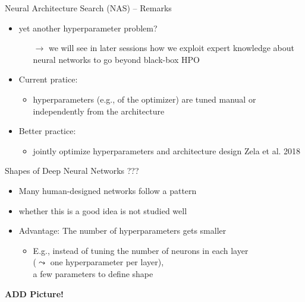 \begin{frame}[c]{Neural Architecture Search (NAS) -- Remarks}

\begin{itemize}
  \item yet another hyperparameter problem?
  \begin{itemize}
    \item[$\to$] we will see in later sessions how we exploit expert knowledge about neural networks to go beyond black-box HPO
  \end{itemize}
  \pause
  \bigskip
  \item Current pratice: 
  \begin{itemize}
    \item hyperparameters (e.g., of the optimizer) are tuned manual or independently from the architecture
  \end{itemize}
  \pause
  \item Better practice:
  \begin{itemize}
    \item jointly optimize hyperparameters and architecture design {Zela et al. 2018}
  \end{itemize}
\end{itemize}

\end{frame}
\begin{frame}[c]{Shapes of Deep Neural Networks {???}}

\begin{itemize}
  \item Many human-designed networks follow a pattern
  \item whether this is a good idea is not studied well
  \item Advantage: The number of hyperparameters gets smaller
  \begin{itemize}
    \item E.g., instead of tuning the number of neurons in each layer\\ ($\leadsto$ one hyperparameter per layer),\\
          a few parameters to define shape
  \end{itemize} 
\end{itemize}

\textbf{ADD Picture!}

\end{frame}
